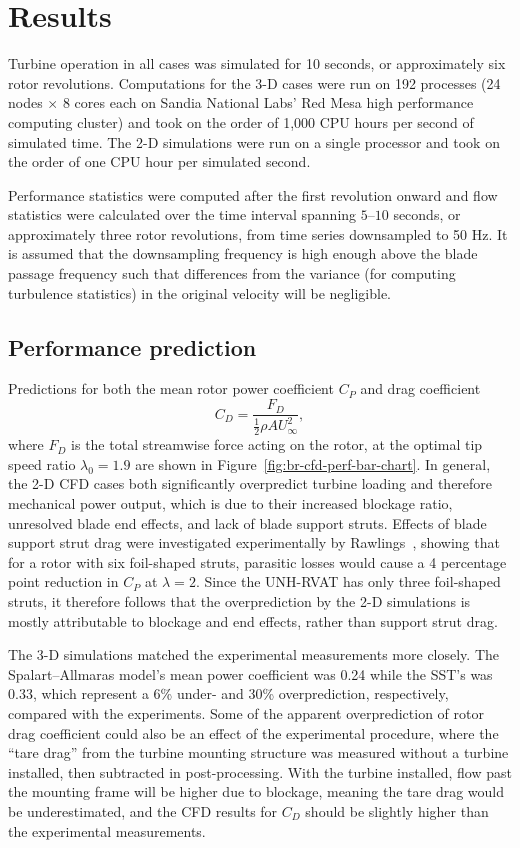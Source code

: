 \documentclass[aip,graphicx]{revtex4-1}
\begin{document}
\section{Results}

Turbine operation in all cases was simulated for 10 seconds, or approximately
six rotor revolutions. Computations for the 3-D cases were run on 192 processes
(24 nodes $\times$ 8 cores each on Sandia National Labs' Red Mesa high
performance computing cluster) and took on the order of 1,000 CPU hours per
second of simulated time. The 2-D simulations were run on a single processor and
took on the order of one CPU hour per simulated second.

Performance statistics were computed after the first revolution onward and flow
statistics were calculated over the time interval spanning $5$--$10$ seconds, or
approximately three rotor revolutions, from time series downsampled to 50 Hz. It
is assumed that the downsampling frequency is high enough above the blade
passage frequency such that differences from the variance (for computing
turbulence statistics) in the original velocity will be negligible.


\subsection{Performance prediction}

Predictions for both the mean rotor power coefficient $C_P$ and drag coefficient
\begin{equation}
    C_D = \frac{F_D}{\frac{1}{2} \rho A U_\infty^2},
    \label{eq:cd}
\end{equation}
where $F_D$ is the total streamwise force acting on the rotor, at the optimal
tip speed ratio $\lambda_0 = 1.9$ are shown in
Figure~\ref{fig:br-cfd-perf-bar-chart}. In general, the 2-D CFD cases both
significantly overpredict turbine loading and therefore mechanical power output,
which is due to their increased blockage ratio, unresolved blade end effects,
and lack of blade support struts. Effects of blade support strut drag were
investigated experimentally by Rawlings~\cite{Rawlings2008}, showing that for a
rotor with six foil-shaped struts, parasitic losses would cause a 4 percentage
point reduction in $C_P$ at $\lambda=2$. Since the UNH-RVAT has only three
foil-shaped struts, it therefore follows that the overprediction by the 2-D
simulations is mostly attributable to blockage and end effects, rather than
support strut drag.

The 3-D simulations matched the experimental measurements more closely. The
Spalart--Allmaras model's mean power coefficient was 0.24 while the SST's was
0.33, which represent a 6\% under- and 30\% overprediction, respectively,
compared with the experiments. Some of the apparent overprediction of rotor drag
coefficient could also be an effect of the experimental procedure, where the
``tare drag'' from the turbine mounting structure was measured without a turbine
installed, then subtracted in post-processing. With the turbine installed, flow
past the mounting frame will be higher due to blockage, meaning the tare drag
would be underestimated, and the CFD results for $C_D$ should be slightly higher
than the experimental measurements.
\end{document}
